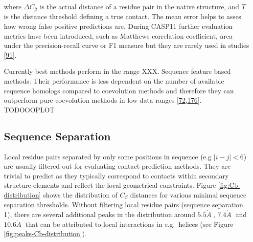 \documentclass[11pt,a4paper,twoside]{book}
\newcommand{\Cb}{C_\beta}
\newcommand{\angstrom}{\mathring{A} \;}
\theoremstyle{definition}
\theoremstyle{definition}
\theoremstyle{remark}
\begin{document}
where \(\Delta\Cb\) is the actual distance of a residue pair in the
native structure, and \(T\) is the distance threshold defining a true
contact. The mean error helps to asses how wrong false positive
predictions are. During CASP11 further evaluation metrics have been
introduced, such as Matthews correlation coefficient, area under the
precision-recall curve or F1 measure but they are rarely used in studies
{[}\protect\hyperlink{ref-Monastyrskyy2015}{91}{]}.

Currently best methods perform in the range XXX. Sequence feature based
methods: Their performance is less dependent on the number of available
sequence homologs compared to coevolution methods and therefore they can
outperform pure coevolution methods in low data ranges
{[}\protect\hyperlink{ref-Wang2013}{72},\protect\hyperlink{ref-Kosciolek2015a}{176}{]}.
TODOOOPLOT

\subsection{Sequence Separation}\label{seq-sep}

Local residue pairs separated by only some positions in sequence (e.g
\(|i-j| < 6\)) are usually filtered out for evaluating contact
prediction methods. They are trivial to predict as they typically
correspond to contacts within secondary structure elements and reflect
the local geometrical constraints. Figure \ref{fig:Cb-distribution}
shows the distribution of \(\Cb\) distances for various minimal sequence
separation thresholds. Without filtering local residue pairs (sequence
separation 1), there are several additional peaks in the distribution
around \(5.5\angstrom\), \(7.4\angstrom\) and \(10.6\angstrom\) that can
be attributed to local interactions in e.g.~helices (see Figure
\ref{fig:peaks-Cb-distribution}).
\end{document}
